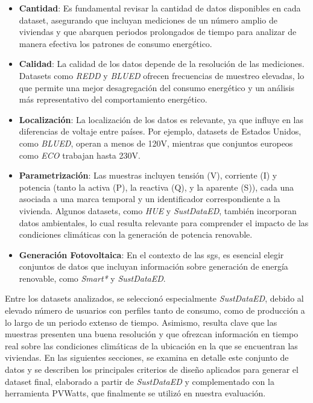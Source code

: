 \begin{itemize}
    \item \textbf{Cantidad}: Es fundamental revisar la cantidad de datos disponibles en cada dataset, asegurando que incluyan mediciones de un número amplio de viviendas y que abarquen periodos prolongados de tiempo para analizar de manera efectiva los patrones de consumo energético.

    \item \textbf{Calidad}: La calidad de los datos depende de la resolución de las mediciones. Datasets como \textit{REDD} y \textit{BLUED} ofrecen frecuencias de muestreo elevadas, lo que permite una mejor desagregación del consumo energético y un análisis más representativo del comportamiento energético.
    
    \item \textbf{Localización}: La localización de los datos es relevante, ya que influye en las diferencias de voltaje entre países. Por ejemplo, datasets de Estados Unidos, como \textit{BLUED}, operan a menos de 120V, mientras que conjuntos europeos como \textit{ECO} trabajan hasta 230V.
    
    \item \textbf{Parametrización}: Las muestras incluyen tensión (V), corriente (I) y potencia (tanto la activa (P), la reactiva (Q), y la aparente (S)), cada una asociada a una marca temporal y un identificador correspondiente a la vivienda. Algunos datasets, como \textit{HUE} y \textit{SustDataED}, también incorporan datos ambientales, lo cual resulta relevante para comprender el impacto de las condiciones climáticas con la generación de potencia renovable.
    
    \item \textbf{Generación Fotovoltaica}: En el contexto de las \glspl{sg}, es esencial elegir conjuntos de datos que incluyan información sobre generación de energía renovable, como \textit{Smart*} y \textit{SustDataED}.
\end{itemize}

Entre los datasets analizados, se seleccionó especialmente \textit{SustDataED}, debido al elevado número de usuarios con perfiles tanto de consumo, como de producción a lo largo de un periodo extenso de tiempo. Asimismo, resulta clave que las muestras presenten una buena resolución y que ofrezcan información en tiempo real sobre las condiciones climáticas de la ubicación en la que se encuentran las viviendas. En las siguientes secciones, se examina en detalle este conjunto de datos y se describen los principales criterios de diseño aplicados para generar el dataset final, elaborado a partir de \textit{SustDataED} y complementado con la herramienta PVWatts, que finalmente se utilizó en nuestra evaluación.

